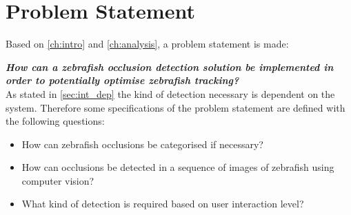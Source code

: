 \chapter{Problem Statement}\label{ch:prob_state}
Based on \autoref{ch:intro} and \autoref{ch:analysis}, a problem statement is made:

\textbf{\textit{How can a zebrafish occlusion detection solution be implemented in order to potentially optimise zebrafish tracking?}}\\

As stated in \autoref{sec:int_dep} the kind of detection necessary is dependent on the system. Therefore some specifications of the problem statement are defined with the following questions:
\begin{itemize}
	\item How can zebrafish occlusions be categorised if necessary?
	\item How can occlusions be detected in a sequence of images of zebrafish using computer vision? %
	\item What kind of detection is required based on user interaction level?
\end{itemize}


